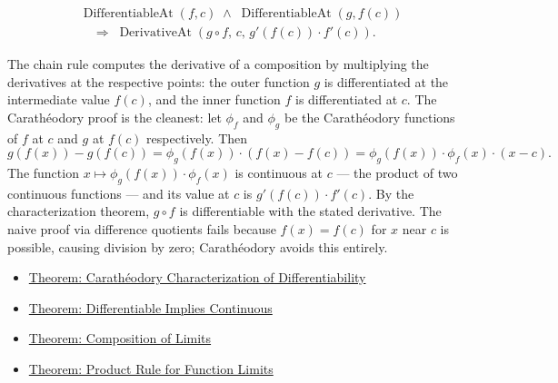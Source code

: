 \begin{remark*}
\begin{align*}
&\operatorname{DifferentiableAt}(f,c) \;\land\; \operatorname{DifferentiableAt}(g,f(c))\\
&\quad\Rightarrow\;
\operatorname{DerivativeAt}(g\circ f,\,c,\,g'(f(c))\cdot f'(c)).
\end{align*}
\end{remark*}

\begin{remark*}[Interpretation]
The chain rule computes the derivative of a composition by multiplying the derivatives at the respective points: the outer function $g$ is differentiated at the intermediate value $f(c)$, and the inner function $f$ is differentiated at $c$. The Carath\'{e}odory proof is the cleanest: let $\phi_f$ and $\phi_g$ be the Carath\'{e}odory functions of $f$ at $c$ and $g$ at $f(c)$ respectively. Then
\[
g(f(x)) - g(f(c)) = \phi_g(f(x))\cdot(f(x)-f(c)) = \phi_g(f(x))\cdot\phi_f(x)\cdot(x-c).
\]
The function $x \mapsto \phi_g(f(x))\cdot\phi_f(x)$ is continuous at $c$ --- the product of two continuous functions --- and its value at $c$ is $g'(f(c))\cdot f'(c)$. By the characterization theorem, $g\circ f$ is differentiable with the stated derivative. The naive proof via difference quotients fails because $f(x) = f(c)$ for $x$ near $c$ is possible, causing division by zero; Carath\'{e}odory avoids this entirely.
\end{remark*}

\begin{dependencies}
\begin{itemize}
  \item \hyperref[thm:caratheodory-characterization-of-differentiability]{Theorem: Carath\'{e}odory Characterization of Differentiability}
  \item \hyperref[thm:differentiable-implies-continuous]{Theorem: Differentiable Implies Continuous}
  \item \hyperref[thm:composition-of-limits]{Theorem: Composition of Limits}
  \item \hyperref[thm:limit-product]{Theorem: Product Rule for Function Limits}
\end{itemize}
\end{dependencies}
